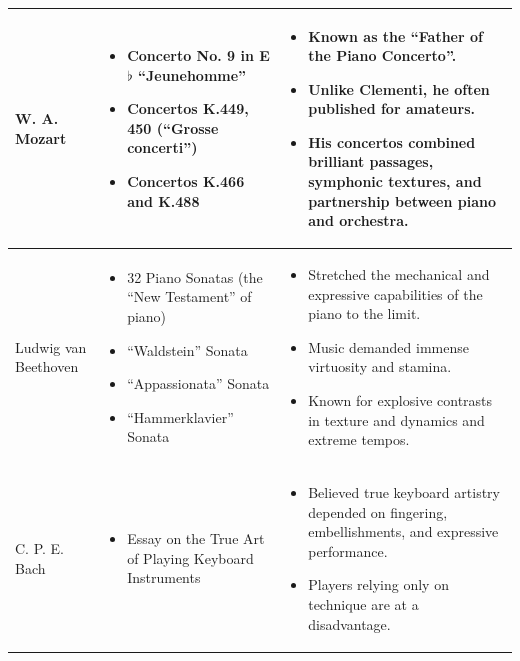 \documentclass[math,code]{amznotes}
\theoremstyle{remark}
\begin{document}
\begin{longtable}{|p{3cm}|p{6cm}|p{7cm}|}
W. A. Mozart &
\begin{itemize}[leftmargin=*]
\item Concerto No. 9 in E$\flat$ ``Jeunehomme''
\item Concertos K.449, 450 (``Grosse concerti'')
\item Concertos K.466 and K.488
\end{itemize}
&
\begin{itemize}[leftmargin=*]
\item Known as the ``Father of the Piano Concerto''.
\item Unlike Clementi, he often published for amateurs.
\item His concertos combined brilliant passages, symphonic textures, and partnership between piano and orchestra.
\end{itemize}
\\
\hline


Ludwig van Beethoven &
\begin{itemize}[leftmargin=*]
\item 32 Piano Sonatas (the ``New Testament'' of piano)
\item ``Waldstein'' Sonata
\item ``Appassionata'' Sonata
\item ``Hammerklavier'' Sonata
\end{itemize}
&
\begin{itemize}[leftmargin=*]
\item Stretched the mechanical and expressive capabilities of the piano to the limit.
\item Music demanded immense virtuosity and stamina.
\item Known for explosive contrasts in texture and dynamics and extreme tempos.
\end{itemize}
\\
\hline


C. P. E. Bach &
\begin{itemize}[leftmargin=*]
\item Essay on the True Art of Playing Keyboard Instruments
\end{itemize}
&
\begin{itemize}[leftmargin=*]
\item Believed true keyboard artistry depended on fingering, embellishments, and expressive performance.
\item Players relying only on technique are at a disadvantage.
\end{itemize}
\\
\hline



\end{longtable}
\end{document}
